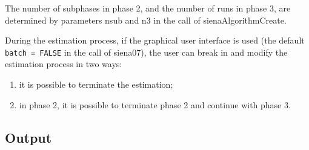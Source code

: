 \documentclass[a4paper,fleqn,11pt]{article}
\newcommand{\+}{\, + \,}
\begin{document}
The number of subphases in phase 2, and the number of runs in
phase 3, are determined by parameters \textsf{nsub} and \textsf{n3}
in the call of \textsf{sienaAlgorithmCreate}.

During the estimation process, if the graphical user interface
is used (the default \\
\texttt{batch = FALSE} in the call of \textsf{siena07}),
the user can break in and modify the estimation process in two
ways:
\begin{enumerate}
\item it is possible to terminate the estimation;
\item in phase 2, it is possible to terminate phase 2
      and continue with phase 3.
\end{enumerate}



\subsection{Output}
\label{S_output}
\end{document}
